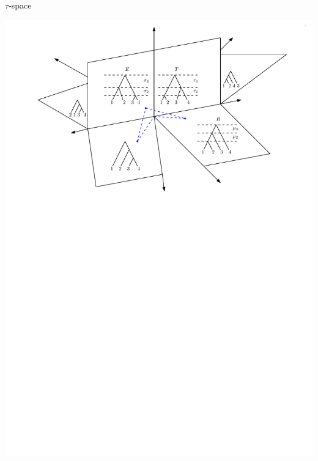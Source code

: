 \documentclass{beamer}
\theoremstyle{example}
\begin{document}
\begin{frame}{$\tau$-space}
\begin{definition}
\includegraphics[width=\framewidth]{tauSpace}
\end{definition}
\end{frame}
\end{document}
